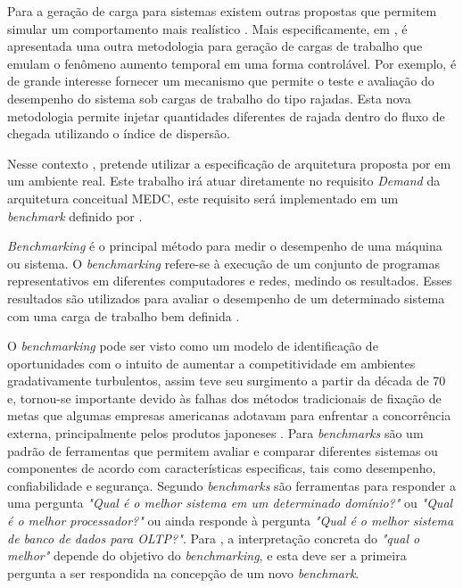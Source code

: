 Para a geração de carga para sistemas existem outras propostas que permitem simular um comportamento mais realístico \cite{Mi2010, Mi2009,Mi2008}. Mais especificamente, em , é apresentada uma outra metodologia para geração de cargas de trabalho que emulam o fenômeno aumento temporal em uma forma controlável. Por exemplo, é de grande interesse fornecer um mecanismo que permite o teste e avaliação do desempenho do sistema sob cargas de trabalho do tipo rajadas. Esta nova metodologia permite injetar quantidades diferentes de rajada dentro do fluxo de chegada utilizando o índice de dispersão. 

Nesse contexto , pretende utilizar a especificação de arquitetura proposta por  em um ambiente real. Este trabalho irá atuar diretamente no requisito \textit{Demand} da arquitetura conceitual MEDC, este requisito será implementado em um \textit{benchmark} definido por .

\textit{Benchmarking} é o principal método para medir o desempenho de uma máquina ou sistema. O \textit{benchmarking} refere-se à execução de um conjunto de programas representativos em diferentes computadores e redes, medindo os resultados. Esses resultados são utilizados para avaliar o desempenho de um determinado sistema com uma carga de trabalho bem definida \cite{Menasce2001}.

O \textit{benchmarking} pode ser visto como um modelo de identificação de oportunidades com o intuito de aumentar a competitividade em ambientes gradativamente turbulentos, assim teve seu surgimento a partir da década de 70 e, tornou-se importante devido às falhas dos métodos tradicionais de fixação de metas que algumas empresas americanas adotavam para enfrentar a concorrência externa, principalmente pelos produtos japoneses \cite{Camila2008}. Para  \textit{benchmarks} são um padrão de ferramentas que permitem avaliar e comparar diferentes sistemas ou componentes de acordo com características especificas, tais como desempenho, confiabilidade e segurança. Segundo  \textit{benchmarks} são ferramentas para responder a uma pergunta \textit{"Qual é o melhor sistema em um determinado domínio?"} ou  \textit{"Qual é o melhor processador?"} ou ainda responde à pergunta \textit{"Qual é o melhor sistema de banco de dados para OLTP?"}. Para , a interpretação concreta do \textit{"qual o melhor"} depende do objetivo do \textit{benchmarking}, e esta deve ser a primeira pergunta a ser respondida na concepção de um novo \textit{benchmark}. 


